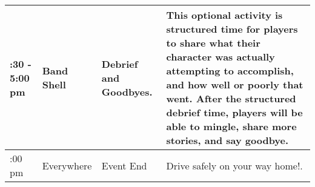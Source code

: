 \documentclass[green]{GL2020}
\begin{document}
\begin{tabularx}{\textwidth}{|>{\centering\arraybackslash} m{1.5cm} | >{\centering\arraybackslash} m{1.8cm} | >{\centering\arraybackslash} m{1.8cm} | >{\centering\arraybackslash}X |}
 \hline
  3:30 - 5:00 pm & Band Shell & Debrief and Goodbyes. & This \textbf{optional} activity is structured time for players to share what their character was actually attempting to accomplish, and how well or poorly that went. After the structured debrief time, players will be able to mingle, share more stories, and say goodbye.  \\
 \hline
  5:00 pm & Everywhere & Event End & Drive safely on your way home!.  \\
	\hline
\end{tabularx}
\end{document}
